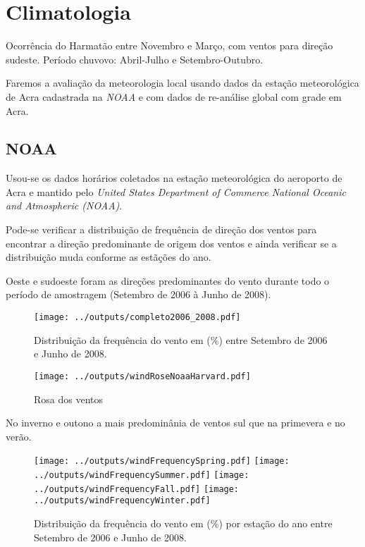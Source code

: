 \section{Climatologia}

Ocorrência do Harmatão entre Novembro e Março, com ventos para direção sudeste.
Período chuvovo: Abril-Julho e Setembro-Outubro.

Faremos a avaliação da meteorologia local usando dados da estação meteorológica
de Acra cadastrada na \textit{NOAA} e com dados de re-análise global com grade
em Acra. 

\subsection{NOAA}

Usou-se os dados horários coletados na estação meteorológica do aeroporto 
de Acra e mantido pelo
\textit{United States Department of Commerce National Oceanic 
and Atmospheric (NOAA)}.

Pode-se verificar a distribuição de frequência de
direção dos ventos para encontrar a direção predominante de origem dos ventos e 
ainda verificar se a distribuição muda conforme as estãções do ano.  


Oeste e sudoeste foram as direções predominantes do vento durante todo o período 
de amostragem (Setembro de 2006 à Junho de 2008).
 
\begin{figure}[H]
\begin{center}
  \texttt{[image: ../outputs/completo2006\_2008.pdf]}
  \caption{Distribuição da frequência do vento em (\%) entre
           Setembro de 2006 e Junho de 2008.}
\end{center}
\end{figure}


\begin{figure}[H]
\begin{center}
  \texttt{[image: ../outputs/windRoseNoaaHarvard.pdf]}
  \caption{Rosa dos ventos}
\end{center}
\end{figure}


No inverno e outono a mais predominânia de ventos sul que na primevera 
e no verão. 

\begin{figure}[H]
\begin{center}
  \texttt{[image: ../outputs/windFrequencySpring.pdf]}
  \texttt{[image: ../outputs/windFrequencySummer.pdf]}
  \texttt{[image: ../outputs/windFrequencyFall.pdf]}
  \texttt{[image: ../outputs/windFrequencyWinter.pdf]}
\end{center}

\caption{Distribuição da frequência do vento em (\%) por estação do ano entre
         Setembro de 2006 e Junho de 2008.}
\end{figure}

